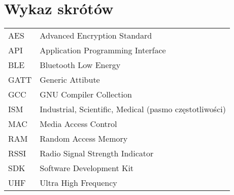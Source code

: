 \chapter*{Wykaz skrótów}

\begin{tabular}{l l}
AES & Advanced Encryption Standard \\
API & Application Programming Interface \\
BLE & Bluetooth Low Energy \\
GATT & Generic Attibute \\
GCC & GNU Compiler Collection \\
ISM & Industrial, Scientific, Medical (pasmo częstotliwości) \\
MAC & Media Access Control \\
RAM & Random Access Memory \\
RSSI & Radio Signal Strength Indicator \\
SDK & Software Development Kit \\
UHF & Ultra High Frequency \\




\end{tabular}
